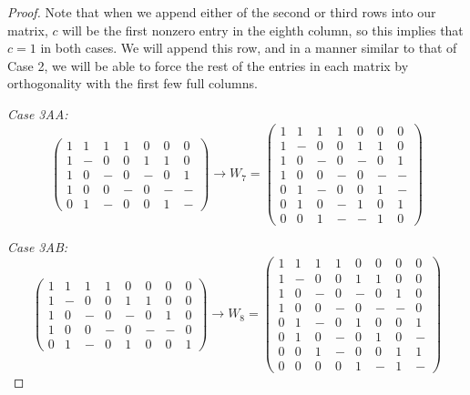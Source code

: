 \begin{lemma}
\begin{proof}
Note that when we append either of the second or third rows into our matrix, $c$ will be the first nonzero entry in the eighth column, so this implies that $c=1$ in both cases. We will append this row, and in a manner similar to that of Case 2, we will be able to force the rest of the entries in each matrix by orthogonality with the first few full columns.

\emph{Case 3AA:} 
 $$\left(\begin{array}{ccccccc}
     1 & 1 & 1 & 1 & 0 & 0 & 0\\
     1 & - & 0 & 0 & 1 & 1 & 0\\
     1 & 0 & - & 0 & - & 0 & 1\\
     1 & 0 & 0 & - & 0 & - & -\\
     0 & 1 & - & 0 & 0 & 1 & -
    \end{array}\right)
   \longrightarrow
    W_7=\left(\begin{array}{ccccccc}
     1 & 1 & 1 & 1 & 0 & 0 & 0\\
     1 & - & 0 & 0 & 1 & 1 & 0\\
     1 & 0 & - & 0 & - & 0 & 1\\
     1 & 0 & 0 & - & 0 & - & -\\
     0 & 1 & - & 0 & 0 & 1 & -\\
     0 & 1 & 0 & - & 1 & 0 & 1\\
     0 & 0 & 1 & - & - & 1 & 0
    \end{array}\right)$$

\emph{Case 3AB:}
 $$\left(\begin{array}{cccccccc}
     1 & 1 & 1 & 1 & 0 & 0 & 0 & 0\\
     1 & - & 0 & 0 & 1 & 1 & 0 & 0\\
     1 & 0 & - & 0 & - & 0 & 1 & 0\\
     1 & 0 & 0 & - & 0 & - & - & 0\\
     0 & 1 & - & 0 & 1 & 0 & 0 & 1
    \end{array}\right)
   \longrightarrow
    W_8 = \left(\begin{array}{cccccccc}
     1 & 1 & 1 & 1 & 0 & 0 & 0 & 0\\
     1 & - & 0 & 0 & 1 & 1 & 0 & 0\\
     1 & 0 & - & 0 & - & 0 & 1 & 0\\
     1 & 0 & 0 & - & 0 & - & - & 0\\
     0 & 1 & - & 0 & 1 & 0 & 0 & 1\\
     0 & 1 & 0 & - & 0 & 1 & 0 & -\\
     0 & 0 & 1 & - & 0 & 0 & 1 & 1\\
     0 & 0 & 0 & 0 & 1 & - & 1 & -
    \end{array}\right)$$


\end{proof}
\end{lemma}
